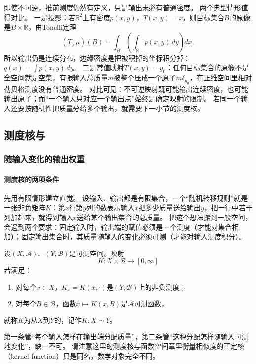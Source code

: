 即使不可逆，推前测度仍然有定义，只是输出未必有普通密度。
两个典型情形值得对比。
一是投影：若$\mathbb R^2$上有密度$p(x,y)$，$T(x,y)=x$，则目标集合$B$的原像是$B\times\mathbb R$，由Tonelli定理
\[
 (T_\#\mu)(B)=\int_B\left(\int_{\mathbb R}p(x,y)\,dy\right)dx,
\]
所以输出仍是连续分布，边缘密度是把被积掉的坐标积分掉：$q(x)=\int p(x,y)\,dy$。
二是常值映射$T(x,y)=y_0$：任何目标集合的原像不是全空间就是空集，有限输入总质量$m$被整个压成一个原子$m\delta_{y_0}$，在正维空间里相对勒贝格测度没有普通密度。
对比可见：不可逆映射既可能输出连续密度，也可能输出原子；而“一个输入只对应一个输出点”始终是确定映射的限制。
若同一个输入还要按随机性把质量分给多个输出，就需要下一小节的测度核。

\subsection{测度核与}

\subsubsection{随输入变化的输出权重}

\paragraph{测度核的两项条件}

先用有限情形建立直觉。
设输入、输出都是有限集合，一个“随机转移规则”就是一张非负矩阵$K$：第$x$行第$y$列的数表示输入$x$把多少质量送给输出$y$，把一行中若干列加起来，就得到输入$x$送给某个输出集合的总质量。
把这个想法搬到一般空间，会遇到两个要求：固定输入时，输出端的赋值必须是一个测度（才能对集合相加）；固定输出集合时，其质量随输入的变化必须可测（才能对输入测度积分）。

\begin{definition}[测度核]
\label{def:measure-kernel}
设$(X,\mathcal A)$、$(Y,\mathcal B)$是可测空间。映射
\[
 K:X\times\mathcal B\to[0,\infty]
\]
若满足：
\begin{enumerate}
 \item 对每个$x\in X$，$K_x=K(x,\cdot)$是$(Y,\mathcal B)$上的非负测度；
 \item 对每个$B\in\mathcal B$，函数$x\mapsto K(x,B)$是$\mathcal A$可测函数，
\end{enumerate}
就称$K$为从$X$到$Y$的，记作$K:X\leadsto Y$。
\end{definition}

第一条管“每个输入怎样在输出端分配质量”，第二条管“这种分配怎样随输入可测地变化”，缺一不可。
请注意这里的测度核与函数空间章里衡量相似度的正定核（kernel function）只是同名，数学对象完全不同。

